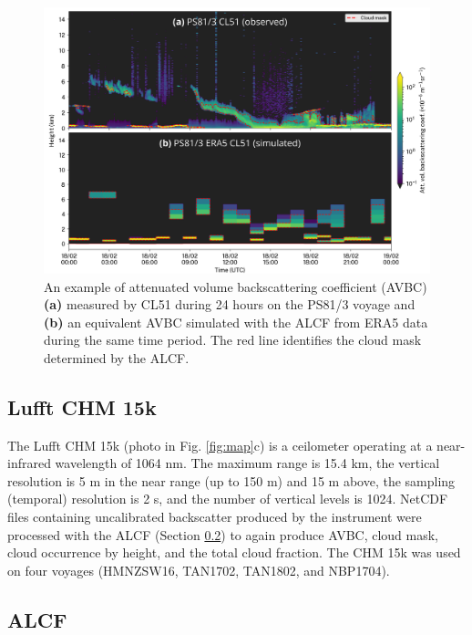 \documentclass[12pt,a4paper]{article}
\begin{document}
\begin{figure}[b!]
\centering
\includegraphics[width=\textwidth]{img/example.png}
\caption{
An example of attenuated volume backscattering coefficient (AVBC) \textbf{(a)}
measured by CL51 during 24 hours on the PS81/3 voyage and \textbf{(b)} an
equivalent AVBC simulated with the ALCF from ERA5 data during the same time
period. The red line identifies the cloud mask determined by the ALCF.
}
\label{fig:example}
\end{figure}

\subsection{Lufft CHM 15k}
\label{sec:chm15k}

The Lufft CHM 15k (photo in Fig. \ref{fig:map}c) is a ceilometer operating at a
near-infrared wavelength of 1064 nm. The maximum range is 15.4 km, the vertical
resolution is 5 m in the near range (up to 150 m) and 15 m above, the sampling
(temporal) resolution is 2 s, and the number of vertical levels is 1024.
NetCDF files containing uncalibrated backscatter produced by the instrument
were processed with the ALCF (Section \ref{sec:alcf}) to again produce AVBC, cloud
mask, cloud occurrence by height, and the total cloud fraction. The CHM 15k was
used on four voyages (HMNZSW16, TAN1702, TAN1802, and NBP1704).

\subsection{ALCF}
\label{sec:alcf}
\end{document}
